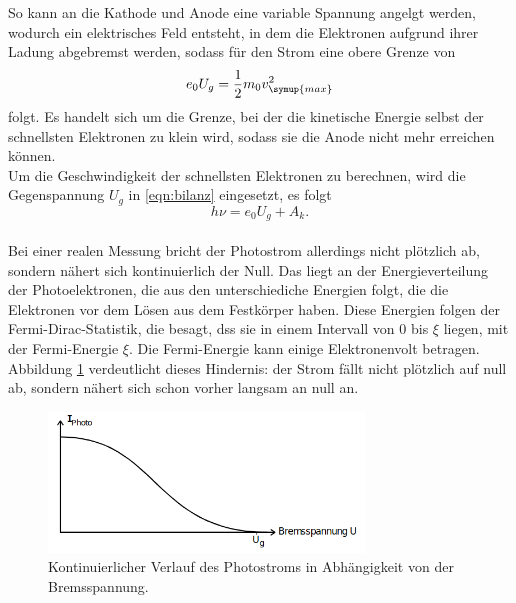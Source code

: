     \noindent So kann an die Kathode und Anode eine variable Spannung angelgt werden,
    wodurch ein elektrisches Feld entsteht, in dem die Elektronen aufgrund ihrer Ladung 
    abgebremst werden, sodass für den Strom eine obere Grenze von 
    \begin{equation}
        e_0 U_g = \frac{1}{2} m_0 v_{\symup{max}}^2
        \label{eqn:abbruch}
    \end{equation}
    folgt. Es handelt sich um die Grenze, bei der die kinetische Energie selbst der schnellsten Elektronen zu 
    klein wird, sodass sie die Anode nicht mehr erreichen können.\\
    Um die Geschwindigkeit der schnellsten Elektronen zu berechnen, wird die Gegenspannung $U_g$ in \eqref{eqn:bilanz}
    eingesetzt, es folgt
    \begin{equation*}
        h \nu = e_0 U_g + A_k .
    \end{equation*}
    \\
    Bei einer realen Messung bricht der Photostrom allerdings nicht plötzlich ab, sondern nähert
    sich kontinuierlich der Null. Das liegt an der Energieverteilung der Photoelektronen, die aus den unterschiediche Energien folgt, 
    die die Elektronen vor dem Lösen aus dem Festkörper haben. Diese Energien folgen der Fermi-Dirac-Statistik, die besagt, dss sie in einem Intervall
    von 0 bis $ \xi $ liegen, mit der Fermi-Energie $\xi$. Die Fermi-Energie kann einige Elektronenvolt betragen.\\
    Abbildung \ref{fig:kurve} verdeutlicht dieses Hindernis: der Strom fällt nicht plötzlich auf null ab, sondern nähert sich schon vorher 
    langsam an null an. 

    \begin{figure}
        \centering
        \includegraphics[width=0.75\textwidth]{kurve.png}
        \caption{Kontinuierlicher Verlauf des Photostroms in Abhängigkeit von der Bremsspannung.}
        \label{fig:kurve}
    \end{figure}

